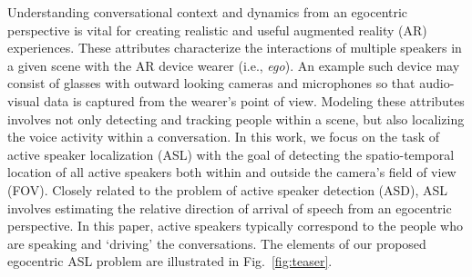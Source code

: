\documentclass[10pt,twocolumn,letterpaper]{article}
\begin{document}
Understanding conversational context and dynamics from an egocentric perspective is vital for creating realistic and useful augmented reality (AR) experiences. 
These attributes characterize the interactions of multiple speakers in a given scene with the AR device wearer (i.e., {\it ego}). 
An example such device may consist of glasses with outward looking cameras and microphones so that audio-visual data is captured from the wearer's point of view. 
Modeling these attributes involves not only 
detecting and tracking people within a scene, but also localizing the voice activity within a conversation.
In this work, we focus on the task of active speaker localization (ASL) with the  
goal of detecting the spatio-temporal location of all active speakers both within and outside the camera's field of view (FOV). 
Closely related to the problem of active speaker detection (ASD), ASL involves estimating 
the relative direction of arrival of speech from an egocentric perspective. 
In this paper, active speakers typically correspond to the people who are speaking and `driving' the conversations.
The elements of our proposed egocentric ASL problem are illustrated in Fig.~\ref{fig:teaser}.
\end{document}
